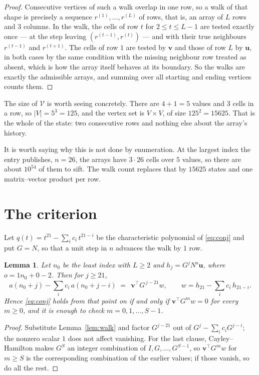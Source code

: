 \documentclass[11pt,a4paper]{article}
\theoremstyle{plain}
\newtheorem{lemma}[theorem]{Lemma}
\theoremstyle{definition}
\begin{document}
\begin{proof}
Consecutive vertices of such a walk overlap in one row, so a walk of that shape is
precisely a sequence $r^{(1)},\dots,r^{(L)}$ of rows, that is, an array of $L$ rows
and $3$ columns. In the walk, the cells of row $t$ for $2\le t\le L-1$ are tested
exactly once --- at the step leaving $(r^{(t-1)},r^{(t)})$ --- and with their true
neighbours $r^{(t-1)}$ and $r^{(t+1)}$. The cells of row $1$ are tested by
$\mathbf{v}$ and those of row $L$ by $\mathbf{u}$, in both cases by the same condition
with the missing neighbour row treated as absent, which is how the array itself behaves at
its boundary. So the walks are exactly the admissible arrays, and summing over all starting
and ending vertices counts them.
\end{proof}


The size of $\mathcal V$ is worth seeing concretely. There are $4+1=5$ values
and $3$ cells in a row, so $|V|=5^{3}=125$, and the vertex set is
$V\times V$, of size $125^2=15625$. That is the whole of the state: two consecutive
rows and nothing else about the array's history.

It is worth saying why this is not done by enumeration. At the largest index the entry
publishes, $n=26$, the arrays have $3\cdot26$ cells over
$5$ values, so there are about $10^{54}$ of them to sift. The
walk count replaces that by $15625$ states and one matrix--vector product per row.
\section{The criterion}

Let $q(t)=t^{21}-\sum_i c_i\,t^{21-i}$ be the characteristic polynomial of
\eqref{eq:conj} and put $G=N$, so that a unit step in $n$ advances the walk by
$1$ row.

\begin{lemma}\label{lem:crit}
Let $n_0$ be the least index with $L\ge2$ and $h_j=G^{j}N^{o}\mathbf{u}$, where
$o=1n_0+0-2$. Then for $j\ge21$,
\[
a(n_0+j)-\sum_i c_i\,a(n_0+j-i)\;=\;\,\mathbf{v}^{\!\top}G^{\,j-21}w,
\qquad w=h_{21}-\sum_i c_i\,h_{21-i} .
\]
Hence \eqref{eq:conj} holds from that point on if and only if
$\mathbf{v}^{\!\top}G^{m}w=0$ for every $m\ge0$, and it is enough to check
$m=0,1,\dots,S-1$.
\end{lemma}

\begin{proof}
Substitute Lemma~\ref{lem:walk} and factor $G^{j-21}$ out of
$G^{j}-\sum_ic_iG^{j-i}$; the nonzero scalar $1$ does not affect
vanishing. For the last clause, Cayley--Hamilton makes $G^{S}$ an integer combination of
$I,G,\dots,G^{S-1}$, so $\mathbf{v}^{\!\top}G^{m}w$ for $m\ge S$ is the corresponding
combination of the earlier values; if those vanish, so do all the rest.
\end{proof}
\end{document}
